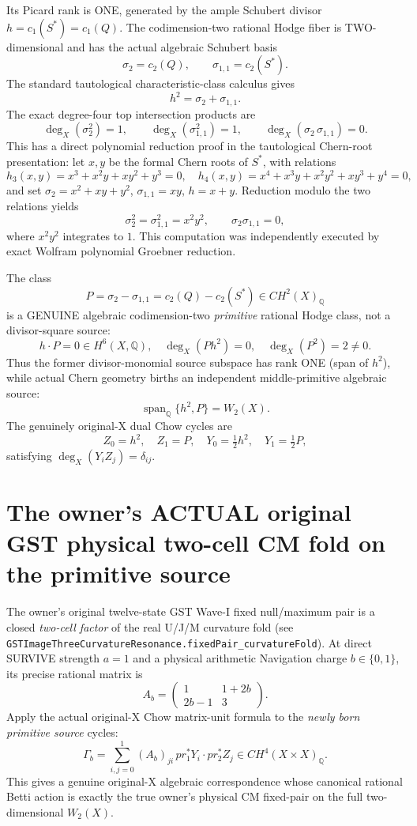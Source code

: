 \documentclass[11pt]{article}
\begin{document}
Its Picard rank is ONE, generated by
the ample Schubert divisor
$h=c_1(S^*)=c_1(Q)$.
The codimension-two rational Hodge fiber is
TWO-dimensional and has the actual algebraic
Schubert basis
\[
\sigma_2=c_2(Q),\qquad
\sigma_{1,1}=c_2(S^*).
\]
The standard tautological characteristic-class
calculus gives
\[
h^2=\sigma_2+\sigma_{1,1}.
\]
The exact degree-four top intersection products are
\[
\deg_X(\sigma_2^2)=1,\qquad
\deg_X(\sigma_{1,1}^2)=1,\qquad
\deg_X(\sigma_2\,\sigma_{1,1})=0.
\]
This has a direct polynomial reduction proof in the
tautological Chern-root presentation:
let $x,y$ be the formal Chern roots of $S^*$,
with relations
\[
h_3(x,y)=x^3+x^2y+xy^2+y^3=0,\quad
h_4(x,y)=x^4+x^3y+x^2y^2+xy^3+y^4=0,
\]
and set
$\sigma_2=x^2+xy+y^2$,
$\sigma_{1,1}=xy$, $h=x+y$.
Reduction modulo the two relations yields
\[
\sigma_2^2=\sigma_{1,1}^2=x^2y^2,\qquad
\sigma_2\sigma_{1,1}=0,
\]
where $x^2y^2$ integrates to $1$.
This computation was independently executed
by exact Wolfram polynomial Groebner reduction.

The class
\[
\boxed{
P=\sigma_2-\sigma_{1,1}
=c_2(Q)-c_2(S^*)\in CH^2(X)_{\mathbb Q}
}
\]
is a GENUINE algebraic codimension-two
\emph{primitive} rational Hodge class,
not a divisor-square source:
\[
h\cdot P=0\in H^6(X,\mathbb Q),\quad
\deg_X(P h^2)=0,\quad
\boxed{\deg_X(P^2)=2\ne0}.
\]
Thus the former divisor-monomial source subspace
has rank ONE (span of $h^2$), while actual
Chern geometry births an independent
middle-primitive algebraic source:
\[
\operatorname{span}_{\mathbb Q}\{h^2,P\}
= W_2(X).
\]
The genuinely original-X dual Chow cycles are
\[
Z_0=h^2,\quad Z_1=P,\quad
Y_0=\tfrac12h^2,\quad Y_1=\tfrac12P,
\]
satisfying $\deg_X(Y_iZ_j)=\delta_{ij}$.

\section{The owner's ACTUAL original GST physical two-cell CM fold on the primitive source}

The owner's original twelve-state GST Wave-I fixed null/maximum
pair is a closed \emph{two-cell factor} of the real U/J/M
curvature fold (see
\texttt{GSTImageThreeCurvatureResonance.fixedPair\_curvatureFold}).
At direct SURVIVE strength $a=1$ and a physical
arithmetic Navigation charge $b\in\{0,1\}$,
its precise rational matrix is
\[
A_b=\begin{pmatrix}1&1+2b\\2b-1&3\end{pmatrix}.
\]
Apply the actual original-X Chow matrix-unit formula
to the \emph{newly born primitive source} cycles:
\[
\boxed{
\Gamma_b=
\sum_{i,j=0}^{1}(A_b)_{ji}
\,pr_1^*Y_i\cdot pr_2^*Z_j
\in CH^4(X\times X)_{\mathbb Q}.
}
\]
This gives a genuine original-X algebraic
correspondence whose canonical rational Betti action
is exactly the true owner's physical CM fixed-pair
on the full two-dimensional $W_2(X)$.
\end{document}

